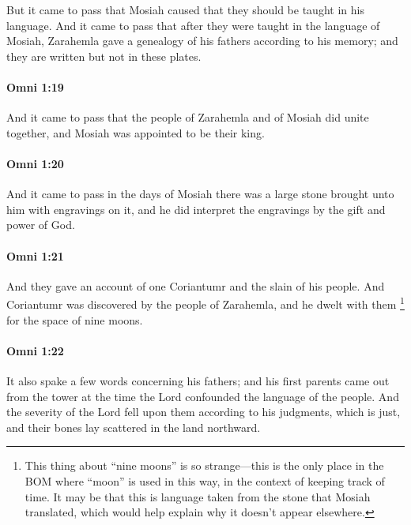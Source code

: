 			But it came to pass that Mosiah caused that they should be taught in his language.
			And it came to pass that after they were taught in the language of Mosiah,
			Zarahemla gave a genealogy of his fathers according to his memory;
			and they are written but not in these plates.

		\paragraph{Omni 1:19} %
			\label{OMNI-1-19}

			And it came to pass that the people of Zarahemla and of Mosiah did unite together,
			and Mosiah was appointed to be their king.

		\paragraph{Omni 1:20} %
			\label{OMNI-1-20}

			And it came to pass in the days of Mosiah
			there was a large stone brought unto him with engravings on it,
			and he did interpret the engravings by the gift and power of God.

		\paragraph{Omni 1:21} %
			\label{OMNI-1-21}

			And they gave an account of one Coriantumr and the slain of his people.
			And Coriantumr was discovered by the people of Zarahemla,
			and he dwelt with them
			\footnote{%
				This thing about ``nine moons'' is so strange---this is the only place in the BOM where ``moon'' is used in this way, in the context of keeping track of time. It may be that this is language taken from the stone that Mosiah translated, which would help explain why it doesn't appear elsewhere.
				}%
			for the space of nine moons.

		\paragraph{Omni 1:22} %
			\label{OMNI-1-22}

			It also spake a few words concerning his fathers;
			and his first parents came out from the tower
			at the time the Lord confounded the language of the people.
			And the severity of the Lord fell upon them
			according to his judgments, which is just,
			and their bones lay scattered in the land northward.

